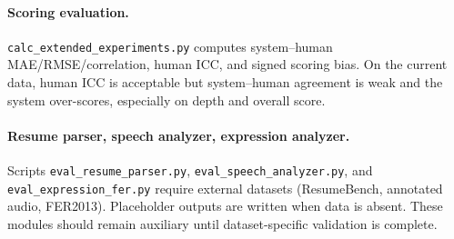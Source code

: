 ﻿\documentclass[final,3p,times,authoryear]{elsarticle}
\begin{document}
\paragraph{Scoring evaluation.} \texttt{calc\_extended\_experiments.py} computes system--human MAE/RMSE/correlation, human ICC, and signed scoring bias. On the current data, human ICC is acceptable but system--human agreement is weak and the system over-scores, especially on depth and overall score.

\paragraph{Resume parser, speech analyzer, expression analyzer.} Scripts \texttt{eval\_resume\_parser.py}, \texttt{eval\_speech\_analyzer.py}, and \texttt{eval\_expression\_fer.py} require external datasets (ResumeBench, annotated audio, FER2013). Placeholder outputs are written when data is absent. These modules should remain auxiliary until dataset-specific validation is complete.


\end{document}
